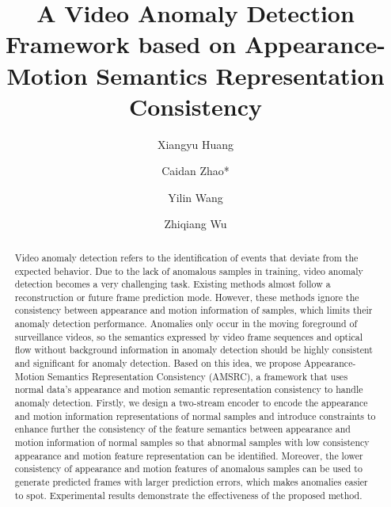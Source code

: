 \documentclass[sigconf]{acmart}
\begin{document}
\title{A Video Anomaly Detection Framework based on Appearance-Motion Semantics Representation Consistency}



\author{Xiangyu Huang}

\author{Caidan Zhao*}

\author{Yilin Wang}
\author{Zhiqiang Wu}




\begin{abstract}
  Video anomaly detection refers to the identification of events that deviate from the expected behavior. Due to the lack of anomalous samples in training, video anomaly detection becomes a very challenging task. Existing methods almost follow a reconstruction or future frame prediction mode. However, these methods ignore the consistency between appearance and motion information of samples, which limits their anomaly detection performance. Anomalies only occur in the moving foreground of surveillance videos, so the semantics expressed by video frame sequences and optical flow without background information in anomaly detection should be highly consistent and significant for anomaly detection. Based on this idea, we propose Appearance-Motion Semantics Representation Consistency (AMSRC), a framework that uses normal data's appearance and motion semantic representation consistency to handle anomaly detection. Firstly, we design a two-stream encoder to encode the appearance and motion information representations of normal samples and introduce constraints to enhance further the consistency of the feature semantics between appearance and motion information of normal samples so that abnormal samples with low consistency appearance and motion feature representation can be identified. Moreover, the lower consistency of appearance and motion features of anomalous samples can be used to generate predicted frames with larger prediction errors, which makes anomalies easier to spot. Experimental results demonstrate the effectiveness of the proposed method.
\end{abstract}
\end{document}
